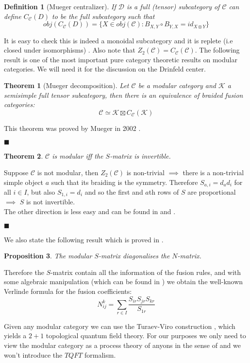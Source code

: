 \documentclass{article}
\newtheorem{definition}{Definition}
\newtheorem{theorem}{Theorem}
\newtheorem{proposition}[theorem]{Proposition}
\newenvironment{proof}[1][Proof]{\begin{trivlist}
\item[\hskip \labelsep {\bfseries #1}]}{\begin{flushright}$\blacksquare$\end{flushright} \end{trivlist}}
\newenvironment{remark}[1][Remark]{\begin{trivlist}
\item[\hskip \labelsep {\bfseries #1}]}{\end{trivlist}}
\newcommand{\cat}{\mathcal{C}}
\begin{document}
\begin{definition}[Mueger centralizer]
	If $\mathcal{D}$ is a full (tensor) subcategory of $\mathcal{C}$ can define $C_\cat(D)$ to be the full subcategory such that 
	$$obj(C_\cat(D))=\{X \in obj(\mathcal{C}): B_{X,Y} \circ B_{Y,X} = id_{X \otimes Y}\}$$
\end{definition}
It is easy to check this is indeed a monoidal subcategory and it is replete (i.e closed under isomorphisms) \cite{Mueger02}. Also note that $Z_2(\cat) = C_\cat(\cat)$.
The following result is one of the most important pure category theoretic results on modular categories. We will need it for the discussion on the Drinfeld center.
\begin{theorem}[Mueger decomposition] \label{muegerdec}
	Let $\cat$ be a modular category and $\mathcal{K}$ a semisimple full tensor subcategory, then there is an equivalence of braided fusion categories:
	$$ \cat \simeq \mathcal{K} \boxtimes C_\cat(\mathcal{K}) $$
\end{theorem}
\begin{proof}
	This theorem was proved by Mueger in 2002 \cite{Mueger02}.
\end{proof}
\begin{theorem}
	$\mathcal{C}$ is modular iff the $S$-matrix is invertible.
\end{theorem}
\begin{proof}
	Suppose $\cat$ is not modular, then $Z_2(\cat)$ is non-trivial $\implies$ there is a non-trivial simple object $a$ such that its braiding is the symmetry. Therefore $S_{a,i}=d_a d_i$ for all $i \in I$, but also $S_{1,i}= d_i$ and so the first and $a$th rows of $S$ are proportional $\implies$ $S$ is not invertible.\\
	The other direction is less easy and can be found in \cite{Bakalov00} and \cite{Mueger02}.
\end{proof}
We also state the following result which is proved in \cite{Bakalov00}.
\begin{proposition}
	The modular $S$-matrix diagonalises the $N$-matrix.
\end{proposition}
Therefore the $S$-matrix contain all the information of the fusion rules, and with some algebraic manipulation (which can be found in \cite{Bakalov00}) we obtain the well-known Verlinde formula for the fusion coefficients:
\begin{equation}
N_{ij}^k = \sum_{r\in I} \frac{S_{ir}S_{jr}S_{kr}}{S_{1r}}
\end{equation}
\begin{remark}
	Given any modular category we can use the Turaev-Viro construction \cite{Balsam12}, which yields a $2+1$ topological quantum field theory. For our purposes we only need to view the modular category as a process theory of anyons in the sense of \cite{Abramsky04} and we won't introduce the $TQFT$ formalism.
\end{remark}
\end{document}
